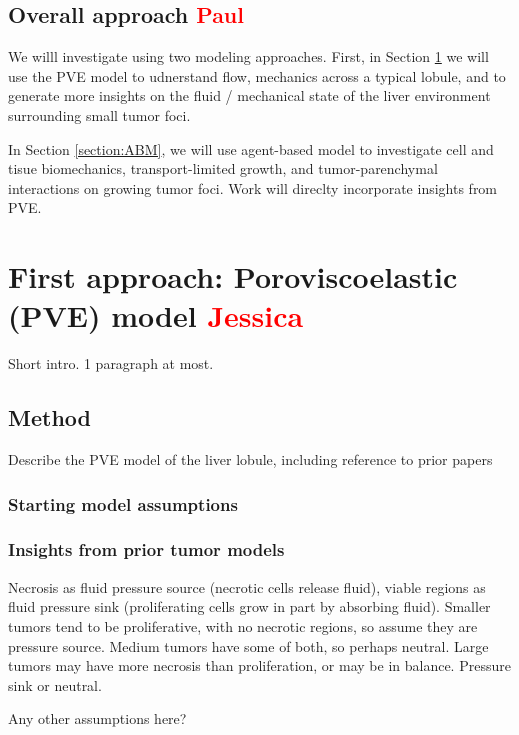 \documentclass[smallextended,natbib]{svjour3}
\newcommand{\red}[1]{\textcolor{red}{#1}}
\begin{document}

\subsection{Overall approach \red{Paul}}
We willl investigate using two modeling approaches. First, in Section 
\ref{section:PVE} we will use the PVE model to udnerstand flow, 
mechanics across a typical lobule, and to generate more insights on 
the fluid / mechanical state of the liver environment surrounding 
small tumor foci. 

In Section \ref{section:ABM}, we will use agent-based model 
to investigate cell and tisue biomechanics, transport-limited 
growth, and tumor-parenchymal interactions on growing tumor foci. 
Work will direclty incorporate insights from PVE. 


\section{First approach: Poroviscoelastic (PVE) model \red{Jessica}}
\label{section:PVE}
Short intro. 1 paragraph at most. 

\subsection{Method}

Describe the PVE model of the liver lobule, including reference to prior papers 
\subsubsection{Starting model assumptions} 
\subsubsection{Insights from prior tumor models} 
Necrosis as fluid pressure source (necrotic cells release fluid), viable regions as fluid pressure sink (proliferating cells grow in part by 
absorbing fluid). Smaller tumors tend to be proliferative, with no necrotic regions, so assume they are pressure source. Medium tumors have some of both, so perhaps neutral. 
Large tumors may have more necrosis than proliferation, or may be in balance. Pressure sink or neutral. 

Any other assumptions here? 
\end{document}
